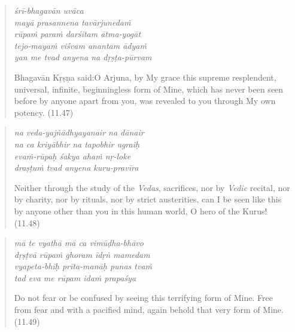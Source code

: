\documentclass[12pt, twoside, openright]{memoir}
\begin{document}
\par
\begin{verse}
\textit{śrī-bhagavān uvāca} \\
\textit{mayā prasannena tavārjunedaṁ} \\
\textit{rūpaṁ paraṁ darśitam ātma-yogāt} \\
\textit{tejo-mayaṁ viśvam anantam ādyaṁ} \\
\textit{yan me tvad anyena na dṛṣṭa-pūrvam}

\noindent \quad Bhagavān Kṛṣṇa said:\linebreak O Arjuna, by My grace this supreme resplendent, universal, infinite, beginningless form of Mine, which has never been seen before by anyone apart from you, was revealed to you through My own potency. (11.47)
\end{verse}
\par



\par
\begin{verse}
\textit{na veda-yajñādhyayanair na dānair} \\
\textit{na ca kriyābhir na tapobhir ugraiḥ} \\
\textit{evaṁ-rūpaḥ śakya ahaṁ nṛ-loke} \\
\textit{draṣṭuṁ tvad anyena kuru-pravīra}

\noindent Neither through the study of the \textit{Vedas}, sacrifices, nor by \textit{Vedic} recital, nor by charity, nor by rituals, nor by strict austerities, can I be seen like this by anyone other than you in this human world, O hero of the Kurus! (11.48)
\end{verse}
\par



\par
\begin{verse}
\textit{mā te vyathā mā ca vimūḍha-bhāvo} \\
\textit{dṛṣṭvā rūpaṁ ghoram īdṛṅ mamedam} \\
\textit{vyapeta-bhīḥ prīta-manāḥ punas tvaṁ} \\
\textit{tad eva me rūpam idaṁ prapaśya}

\noindent Do not fear or be confused by seeing this terrifying form of Mine. Free from fear and with a pacified mind, again behold that very form of Mine. (11.49)
\end{verse}
\par
\end{document}
